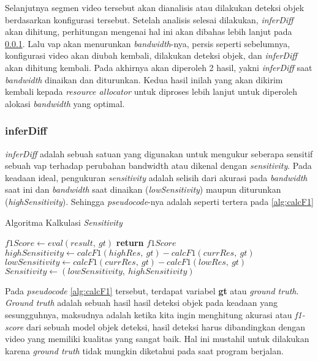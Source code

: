         Selanjutnya segmen video tersebut akan dianalisis atau dilakukan deteksi objek berdasarkan konfigurasi tersebut. Setelah analisis selesai dilakukan, \textit{inferDiff} akan dihitung, perhitungan mengenai hal ini akan dibahas lebih
        lanjut pada \ref{sec:inferDiff}. Lalu \gls{vap} akan menurunkan \textit{bandwidth}-nya, persis seperti sebelumnya, konfigurasi video akan diubah kembali, dilakukan deteksi objek, dan \textit{inferDiff} akan dihitung kembali. Pada akhirnya
        akan diperoleh 2 hasil, yakni \textit{inferDiff} saat \textit{bandwidth} dinaikan dan diturunkan. Kedua hasil inilah yang akan dikirim kembali kepada \textit{resource allocator} untuk diproses lebih lanjut untuk diperoleh alokasi \textit{bandwidth} yang optimal.

        \subsubsection{inferDiff}\label{sec:inferDiff}

        \textit{inferDiff} adalah sebuah satuan yang digunakan untuk mengukur seberapa sensitif sebuah \gls{vap} terhadap perubahan bandwidth atau dikenal dengan \textit{sensitivity}. Pada keadaan ideal, pengukuran \textit{sensitivity}
        adalah selisih dari akurasi pada \textit{bandwidth} saat ini dan \textit{bandwidth} saat dinaikan (\textit{lowSensitivity}) maupun diturunkan (\textit{highSensitivity}). 
        Sehingga \textit{pseudocode}-nya adalah seperti tertera pada \ref{alg:calcF1}

        \begin{algorithm}[tbh]
        \caption{Algoritma Kalkulasi \textit{Sensitivity}}\label{alg:calcF1}
        \begin{algorithmic}[1]
            \State $f1Score \gets eval(result,\ gt)$
            \State \textbf{return} $f1Score$
        \EndFunction
        \State $highSensitivity \gets calcF1(highRes,\ gt) - calcF1(currRes,\ gt)$
        \State $lowSensitivity \gets calcF1(currRes,\ gt) - calcF1(lowRes,\ gt)$
        \State $Sensitivity \gets (lowSensitivity,\ highSensitivity)$
        \EndProcedure
        \end{algorithmic}
        \end{algorithm}

        Pada \textit{pseudocode} \ref{alg:calcF1} tersebut, terdapat variabel \textbf{gt} atau \textit{ground truth}. \textit{Ground truth} adalah sebuah hasil hasil deteksi objek
        pada keadaan yang sesungguhnya, maksudnya adalah ketika kita ingin menghitung akurasi atau \textit{f1-score} dari sebuah model objek deteksi, hasil deteksi harus dibandingkan
        dengan video yang memiliki kualitas yang sangat baik. Hal ini mustahil untuk dilakukan karena \textit{ground truth} tidak mungkin diketahui pada saat program berjalan.

